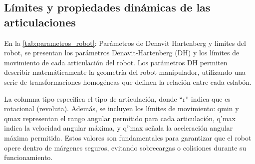 \subsection{Límites y propiedades dinámicas de las articulaciones} \label{subsec:limites_propiedades}


En la \autoref{tab:parametros_robot}: Parámetros de Denavit Hartenberg y límites del robot, se presentan los parámetros Denavit-Hartenberg (DH) y los límites de movimiento de cada articulación del robot. Los parámetros DH permiten describir matemáticamente la geometría del robot manipulador, utilizando una serie de transformaciones homogéneas que definen la relación entre cada eslabón.

La columna tipo especifica el tipo de articulación, donde “r” indica que es rotacional (revoluta). Además, se incluyen los límites de movimiento: qmin y qmax representan el rango angular permitido para cada articulación, q'max indica la velocidad angular máxima, y q''max señala la aceleración angular máxima permitida. Estos valores son fundamentales para garantizar que el robot opere dentro de márgenes seguros, evitando sobrecargas o colisiones durante su funcionamiento.

